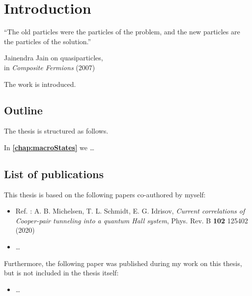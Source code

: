 \chapter{Introduction}
\label{chap:introduction}


\epigraph{``The old particles were the particles of the problem, and the new particles are the particles of the solution.''}{Jainendra Jain on quasiparticles, \\in \emph{Composite Fermions} (2007)}

The work is introduced.

\section*{Outline}

The thesis is structured as follows.

In \textbf{\cref{chap:macroStates}} we \dots

\section*{List of publications}

This thesis is based on the following papers co-authored by myself:
\begin{itemize}
\item Ref. \cite{michelsenCurrent2020}: A. B. Michelsen, T. L. Schmidt, E. G. Idrisov, \textit{Current correlations of Cooper-pair tunneling into a quantum Hall system}, Phys. Rev. B \textbf{102} 125402 (2020)
\item \dots
\end{itemize}
Furthermore, the following paper was published during my work on this thesis, but is not included in the thesis itself:
\begin{itemize}
\item \dots
\end{itemize}

\printnoidxglossary[type=acronym]